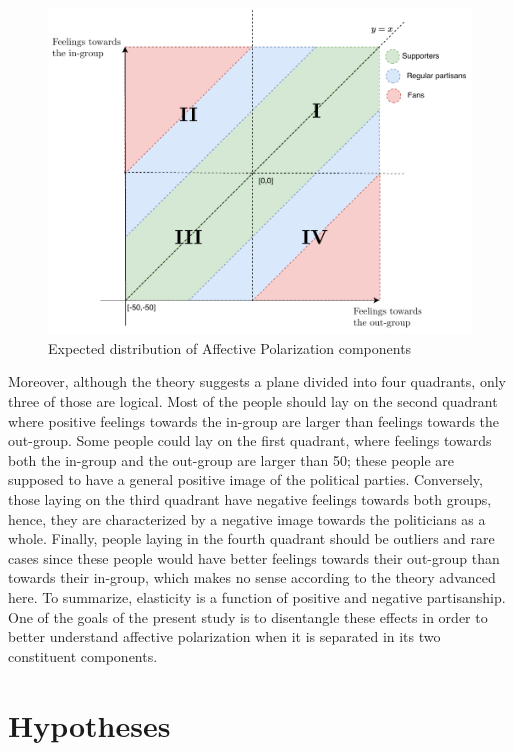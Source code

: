 \documentclass[a4paper, svgnames]{article}
\begin{document}
\begin{figure}[H]
	\centering
	\includegraphics[width=\textwidth]{Figures/Expected empirics.pdf}
	\caption{Expected distribution of Affective Polarization components}
	\label{fig:empirical_expectations}
\end{figure}



Moreover, although the theory suggests a plane divided into four quadrants, only three of those are logical. Most of the people should lay on the second quadrant where positive feelings towards the in-group are larger than feelings towards the out-group. Some people could lay on the first quadrant, where feelings towards both the in-group and the out-group are larger than 50; these people are supposed to have a general positive image of the political parties. Conversely, those laying on the third quadrant have negative feelings towards both groups, hence, they are characterized by a negative image towards the politicians as a whole. Finally, people laying in the fourth quadrant should be outliers and rare cases since these people would have better feelings towards their out-group than towards their in-group, which makes no sense according to the theory advanced here. To summarize, elasticity is a function of positive and negative partisanship. One of the goals of the present study is to disentangle these effects in order to better understand affective polarization when it is separated in its two constituent components.

\newpage

\section{Hypotheses}
\end{document}
